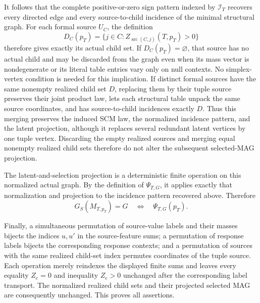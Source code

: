 It follows that the complete positive-or-zero sign pattern indexed by \(\mathcal I_T\) recovers every directed edge and every source-to-child incidence of the minimal structural graph.  For each formal source \(U_C\), the definition
\[
 D_C(p_T)=\{j\in C:Z_{\operatorname{src}(C,j)}(T,p_T)>0\}
\]
therefore gives exactly its actual child set.  If \(D_C(p_T)=\varnothing\), that source has no actual child and may be discarded from the graph even when its mass vector is nondegenerate or its literal table entries vary only on null contexts.  No simplex-vertex condition is needed for this implication.  If distinct formal sources have the same nonempty realized child set \(D\), replacing them by their tuple source preserves their joint product law, lets each structural table unpack the same source coordinates, and has source-to-child incidences exactly \(D\).  Thus this merging preserves the induced SCM law, the normalized incidence pattern, and the latent projection, although it replaces several redundant latent vertices by one tuple vertex.  Discarding the empty realized sources and merging equal nonempty realized child sets therefore do not alter the subsequent selected-MAG projection.

The latent-and-selection projection is a deterministic finite operation on this normalized actual graph.  By the definition of \(\Psi_{T,G}\), it applies exactly that normalization and projection to the incidence pattern recovered above.  Therefore
\[
 G_S(M_{T,p_T})=G
 \quad\Longleftrightarrow\quad
 \Psi_{T,G}(p_T).
\]

Finally, a simultaneous permutation of source-value labels and their masses bijects the indices \(u,u'\) in the source-feature sums; a permutation of response labels bijects the corresponding response contexts; and a permutation of sources with the same realized child-set index permutes coordinates of the tuple source.  Each operation merely reindexes the displayed finite sums and leaves every equality \(Z_e=0\) and inequality \(Z_e>0\) unchanged after the corresponding label transport.  The normalized realized child sets and their projected selected MAG are consequently unchanged.  This proves all assertions.
